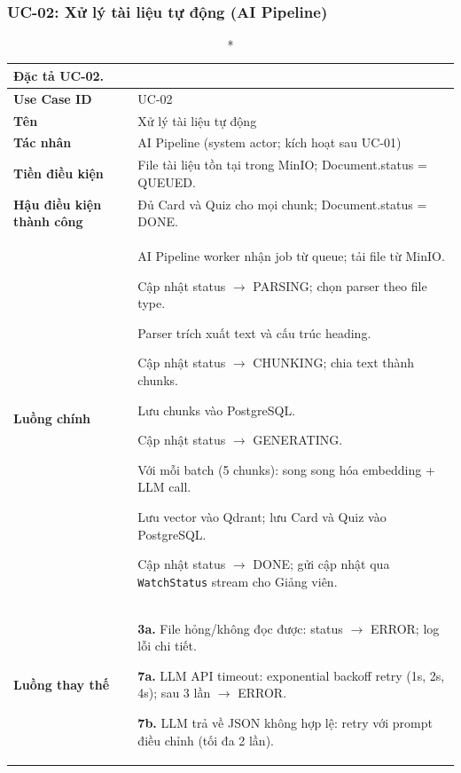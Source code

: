 \subsubsection*{UC-02: Xử lý tài liệu tự động (AI Pipeline)}

\begin{longtable}{|p{3.5cm}|p{11cm}|}
    \caption*{Đặc tả UC-02.} \\
    \hline
    \textbf{Use Case ID} & UC-02 \\ \hline
    \textbf{Tên} & Xử lý tài liệu tự động \\ \hline
    \textbf{Tác nhân} & AI Pipeline (system actor; kích hoạt sau UC-01) \\ \hline
    \textbf{Tiền điều kiện} & File tài liệu tồn tại trong MinIO; Document.status = QUEUED. \\ \hline
    \textbf{Hậu điều kiện thành công} & Đủ Card và Quiz cho mọi chunk; Document.status = DONE. \\ \hline
    \textbf{Luồng chính} &
    \begin{flowenum}
        \item AI Pipeline worker nhận job từ queue; tải file từ MinIO.
        \item Cập nhật status $\to$ PARSING; chọn parser theo file type.
        \item Parser trích xuất text và cấu trúc heading.
        \item Cập nhật status $\to$ CHUNKING; chia text thành chunks.
        \item Lưu chunks vào PostgreSQL.
        \item Cập nhật status $\to$ GENERATING.
        \item Với mỗi batch (5 chunks): song song hóa embedding + LLM call.
        \item Lưu vector vào Qdrant; lưu Card và Quiz vào PostgreSQL.
        \item Cập nhật status $\to$ DONE; gửi cập nhật qua \texttt{WatchStatus} stream cho Giảng viên.
    \end{flowenum} \\ \hline
    \textbf{Luồng thay thế} &
    \begin{nobullets}
        \item \textbf{3a.} File hỏng/không đọc được: status $\to$ ERROR; log lỗi chi tiết.
        \item \textbf{7a.} LLM API timeout: exponential backoff retry (1s, 2s, 4s); sau 3 lần $\to$ ERROR.
        \item \textbf{7b.} LLM trả về JSON không hợp lệ: retry với prompt điều chỉnh (tối đa 2 lần).
    \end{nobullets} \\ \hline
\end{longtable}

